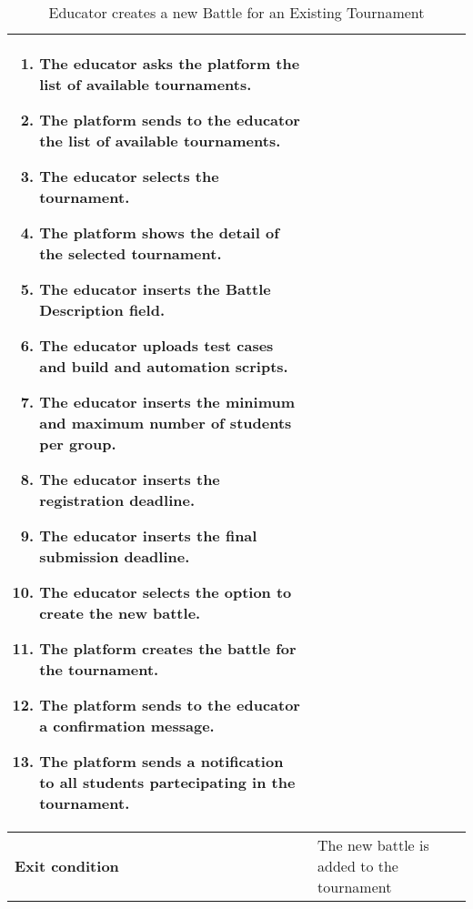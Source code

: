 \begin{enumerate}[label=\textbf{UC\arabic*}:,ref=UC\arabic*,leftmargin=1.3cm]
{\begin{table}[H]
\begin{tabular}{|l|p{11.9cm}|}
\begin{enumerate}[label=\arabic*.]
                              \item The educator asks the platform the list of available tournaments.
                              \item The platform sends to the educator the list of available tournaments.
                              \item The educator selects the tournament.
                              \item The platform shows the detail of the selected tournament.
                              \item The educator inserts the Battle Description field.
                              \item The educator uploads test cases and build and automation scripts.
                              \item The educator inserts the minimum and maximum number of students per group.
                              \item The educator inserts the registration deadline.
                              \item The educator inserts the final submission deadline.
                              \item The educator selects the option to create the new battle.
                              \item The platform creates the battle for the tournament.
                              \item The platform sends to the educator a confirmation message.
                              \item The platform sends a notification to all students partecipating in the tournament.
                        \end{enumerate}                      \\\hline
                        \textbf{Exit condition}  & The new battle is added to the tournament                                         \\\hline
                  \end{tabular}
                  \caption{Educator creates a new Battle for an Existing Tournament        }
                  \label{table:Educator creates a new Battle for an Existing Tournament         }
            \end{table}
}
\end{enumerate}
